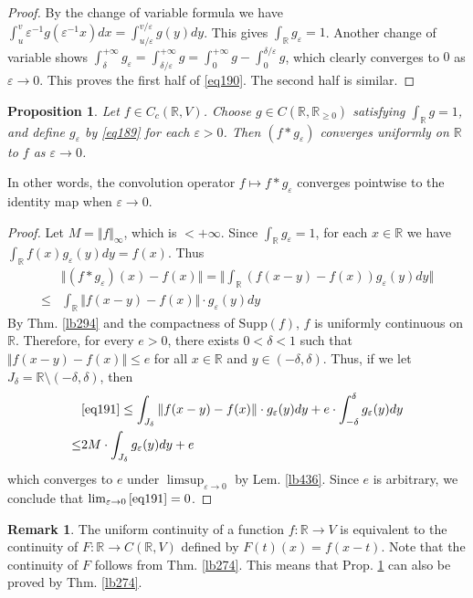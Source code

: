 \documentclass[12pt,b5paper,notitlepage]{article}
\theoremstyle{definition}
\newtheorem{rem}[df]{Remark}
\theoremstyle{plain}
\newtheorem{pp}[df]{Proposition}
\newcommand{\Rbb}{\mathbb R}
\newcommand{\Supp}{\mathrm{Supp}}
\newcommand{\eps}{\varepsilon}
\numberwithin{equation}{section}
\begin{document}
\begin{proof}
By the change of variable formula we have $\int_u^v \eps^{-1}g(\eps^{-1}x)dx=\int_{u/\eps}^{v/\eps}g(y)dy$. This gives $\int_\Rbb g_\eps=1$. Another change of variable shows $\int_\delta^{+\infty}g_\eps=\int_{\delta/\eps}^{+\infty}g=\int_0^{+\infty}g-\int_0^{\delta/\eps}g$, which clearly converges to $0$ as $\eps\rightarrow0$. This proves the first half of \eqref{eq190}. The second half is similar.
\end{proof}




\begin{pp}\label{lb437}
Let $f\in C_c(\Rbb,V)$. Choose $g\in C(\Rbb,\Rbb_{\geq0})$ satisfying $\int_\Rbb g=1$, and define $g_\eps$ by \eqref{eq189} for each $\eps>0$. Then $(f*g_\eps)$ converges uniformly on $\Rbb$ to $f$ as $\eps\rightarrow0$.
\end{pp}

In other words, the convolution operator $f\mapsto f*g_\eps$ converges pointwise to the identity map when $\eps\rightarrow 0$.

\begin{proof}
Let $M=\Vert f\Vert_\infty$, which is $<+\infty$. Since $\int_\Rbb g_\eps=1$, for each $x\in\Rbb$ we have $\int_\Rbb f(x)g_\eps(y)dy=f(x)$. Thus
\begin{align}
&\Vert (f*g_\eps)(x)-f(x)\Vert=\Big\Vert \int_\Rbb(f(x-y)-f(x))g_\eps(y)dy \Big\Vert\nonumber\\
\leq &\int_\Rbb  \Vert f(x-y)-f(x)\Vert \cdot g_\eps(y)dy \label{eq191}
\end{align}
By Thm. \ref{lb294} and the compactness of $\Supp(f)$, $f$ is uniformly continuous on $\Rbb$. Therefore, for every $e>0$, there exists $0<\delta<1$ such that $\Vert f(x-y)-f(x)\Vert\leq e$ for all $x\in\Rbb$ and $y\in(-\delta,\delta)$. Thus, if we let $J_\delta=\Rbb\setminus(-\delta,\delta)$, then
\begin{align*}
&\eqref{eq191}\leq \int_{J_\delta}\Vert f(x-y)-f(x)\Vert \cdot g_\eps(y)dy+e\cdot \int_{-\delta}^\delta g_\eps(y)dy\\
\leq& 2M\cdot \int_{J_\delta} g_\eps(y)dy+e 
\end{align*}
which converges to $e$ under $\limsup_{\eps\rightarrow0}$ by Lem. \ref{lb436}. Since $e$ is arbitrary, we conclude that $\lim_{\eps\rightarrow0}\eqref{eq191}=0$.
\end{proof}

\begin{rem}
The uniform continuity of a function $f:\Rbb\rightarrow V$ is equivalent to the continuity of $F:\Rbb\rightarrow C(\Rbb,V)$ defined by $F(t)(x)=f(x-t)$. Note that the continuity of $F$ follows from Thm. \ref{lb274}. This means that Prop. \ref{lb437} can also be proved by Thm. \ref{lb274}.
\end{rem}
\end{document}
